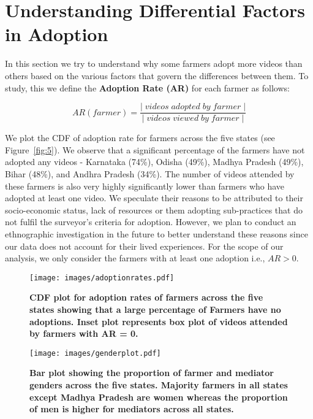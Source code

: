 \documentclass[manuscript,screen]{acmart}
\begin{document}
\section{Understanding Differential Factors in Adoption} \label{differential_factors}

In this section we try to understand why some farmers adopt more videos than others based on the various factors that govern the differences between them. To study, this we define the \textbf{Adoption Rate (AR)} for each farmer as follows: 

\begin{equation}
AR(farmer) = \frac{|\;videos\;adopted\;by\;farmer\;|}{|\;videos\;viewed\;by\;farmer\;|}
\end{equation}

We plot the CDF of adoption rate for farmers across the five states (see Figure~\ref{fig:5}). We observe that a significant percentage of the farmers have not adopted any videos - Karnataka (74\%), Odisha (49\%), Madhya Pradesh (49\%), Bihar (48\%), and Andhra Pradesh (34\%). The number of videos attended by these farmers is also very highly significantly lower than farmers who have adopted at least one video. We speculate their reasons to be attributed to their socio-economic status, lack of resources or them adopting sub-practices that do not fulfil the surveyor’s criteria for adoption. However, we plan to conduct an ethnographic investigation in the future to better understand these reasons since our data does not account for their lived experiences. For the scope of our analysis, we only consider the farmers with at least one adoption i.e., $AR > 0$.

\begin{figure}
\centering
\begin{minipage}{.45\textwidth}
  \centering
    \texttt{[image: images/adoptionrates.pdf]}
    \caption{\textbf{CDF plot for adoption rates of farmers across the five states showing that a large percentage of Farmers have no adoptions. Inset plot represents box plot of videos attended by farmers with AR = 0.}}
    \label{fig:5}
\end{minipage}
\hfill
\begin{minipage}{.45\textwidth}
  \centering
    \texttt{[image: images/genderplot.pdf]}
    \caption{\textbf{Bar plot showing the proportion of farmer and mediator genders across the five states. Majority farmers in all states except Madhya Pradesh are women whereas the proportion of men is higher for mediators across all states.}}
    \label{fig:6}
\end{minipage}%
\end{figure}
\end{document}
